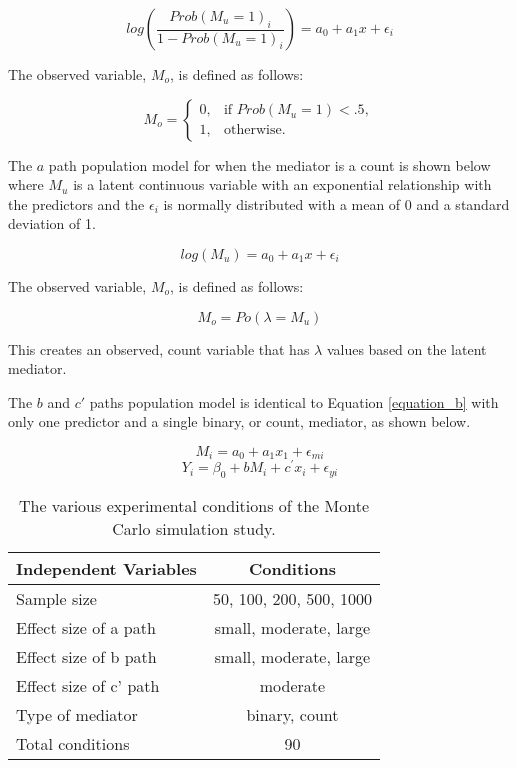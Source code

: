 \documentclass[]{DissertateUSU}
\begin{document}
\begin{equation}
log(\frac{Prob(M_{u} = 1)_{i}}{1 - Prob(M_{u} = 1)_{i}}) = a_0 + a_1 x + \epsilon_i
\end{equation}

\noindent The observed variable, \(M_{o}\), is defined as follows:

\begin{equation}
M_{o} = \begin{cases}
            0, & \text{if } Prob(M_u = 1) < .5, \\
            1, & \text{otherwise}.
         \end{cases}
\end{equation}

The \(a\) path population model for when the mediator is a count is
shown below where \(M_u\) is a latent continuous variable with an
exponential relationship with the predictors and the \(\epsilon_i\) is
normally distributed with a mean of 0 and a standard deviation of 1.

\begin{equation}
log(M_u) = a_0 + a_1 x + \epsilon_i
\end{equation}

\noindent The observed variable, \(M_{o}\), is defined as follows:

\begin{equation}
M_{o} = Po(\lambda = M_u)
\end{equation}

\noindent This creates an observed, count variable that has \(\lambda\)
values based on the latent mediator.

The \(b\) and \(c'\) paths population model is identical to Equation
\ref{equation_b} with only one predictor and a single binary, or count,
mediator, as shown below.

\begin{equation}
M_{i} = a_0 + a_1 x_1 + \epsilon_{mi}
\end{equation}\begin{equation}
Y_{i} = \beta_0 + b M_{i} + c^{'} x_{i} + \epsilon_{yi}
\end{equation}

\begin{table}[tb]
\centering
\caption{The various experimental conditions of the Monte Carlo simulation study.} 
\label{tab_conditions}
\begin{tabular}{lc}
\toprule
Independent Variables & Conditions \\ 
\midrule
Sample size & 50, 100, 200, 500, 1000 \\ 
  Effect size of a path & small, moderate, large \\ 
  Effect size of b path & small, moderate, large \\ 
  Effect size of c' path & moderate \\ 
  Type of mediator & binary, count \\ 
  \midrule
  Total conditions & 90 \\ 
\bottomrule
\end{tabular}
\end{table}
\end{document}
